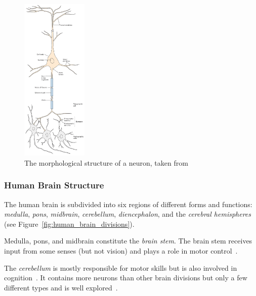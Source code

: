 \begin{figure}
    \begin{center}
        \includegraphics[width=0.28\textwidth]{images/neuron.jpeg}
    \end{center}
    \caption[Neuron structure]{The morphological structure of a neuron, taken from \citet[p. 22]{mack2013principles}}
    \label{fig:neuron_structure}
\end{figure}

\subsubsection{Human Brain Structure}

The human brain is subdivided into six regions of different forms and functions: \textit{medulla}, \textit{pons}, \textit{midbrain}, \textit{cerebellum}, \textit{diencephalon}, and the \textit{cerebral hemispheres}~\citep[p. 340]{mack2013principles} (see Figure~\ref{fig:human_brain_divisions}).

Medulla, pons, and midbrain constitute the \textit{brain stem}.
The brain stem receives input from some senses (but not vision) and plays a role in motor control~\citep[p. 341]{mack2013principles}.

The \textit{cerebellum} is mostly responsible for motor skills but is also involved in cognition~\citep[p. 341]{mack2013principles}.
It contains more neurons than other brain divisions but only a few different types and is well explored~\citep[p. 341]{mack2013principles}.

